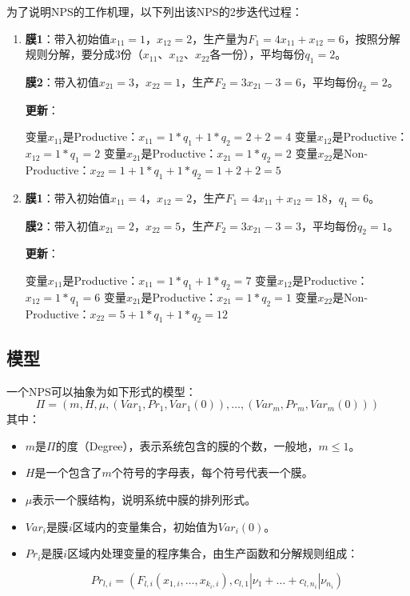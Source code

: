为了说明NPS的工作机理，以下列出该NPS的2步迭代过程：
\begin{enumerate}[Step 1]
\item
\textbf{膜1}：带入初始值$x_{11}=1$，$x_{12}=2$，生产量为$F_1=4x_{11}+x_{12}=6$，按照分解规则分解，要分成3份（$x_{11}$、$x_{12}$、$x_{22}$各一份），平均每份$q_1=2$。

\textbf{膜2}：带入初值$x_{21}=3$，$x_{22}=1$，生产$F_2=3x_{21}-3=6$，平均每份$q_2=2$。

\textbf{更新}：

\subitem 变量$x_{11}$是Productive：$x_{11}=1*q_1+1*q_2=2+2=4$
\subitem 变量$x_{12}$是Productive：$x_{12}=1*q_1=2$
\subitem 变量$x_{21}$是Productive：$x_{21}=1*q_2=2$
\subitem 变量$x_{22}$是Non-Productive：$x_{22}=1+1*q_1+1*q_2=1+2+2=5$

\item
\textbf{膜1}：带入初始值$x_{11}=4$，$x_{12}=2$，生产$F_1=4x_{11}+x_{12}=18$，$q_1=6$。

\textbf{膜2}：带入初值$x_{21}=2$，$x_{22}=5$，生产$F_2=3x_{21}-3=3$，平均每份$q_2=1$。

\textbf{更新}：

\subitem 变量$x_{11}$是Productive：$x_{11}=1*q_1+1*q_2=7$
\subitem 变量$x_{12}$是Productive：$x_{12}=1*q_1=6$
\subitem 变量$x_{21}$是Productive：$x_{21}=1*q_2=1$
\subitem 变量$x_{22}$是Non-Productive：$x_{22}=5+1*q_1+1*q_2=12$
\end{enumerate}

\subsection{模型}
一个NPS可以抽象为如下形式的模型：
\begin{equation}\label{eq:nps}
\Pi = (m,H,\mu, (Var_1,Pr_1,Var_1(0)),\ldots, (Var_m,Pr_m,Var_m(0)))
\end{equation}
其中：
\begin{itemize}
\item $m$是$\Pi$的度（Degree），表示系统包含的膜的个数，一般地，$m\le 1$。
\item $H$是一个包含了$m$个符号的字母表，每个符号代表一个膜。
\item $\mu$表示一个膜结构，说明系统中膜的排列形式。
\item $Var_i$是膜$i$区域内的变量集合，初始值为$Var_i(0)$。
\item $Pr_i$是膜$i$区域内处理变量的程序集合，由生产函数和分解规则组成：

\[Pr_{l,i} = (F_{l,i}(x_{1,i},\ldots,x_{k_i,i}), c_{l,1}|\nu_1 + \ldots + c_{l,n_i}|\nu_{n_i})\]
\end{itemize}

